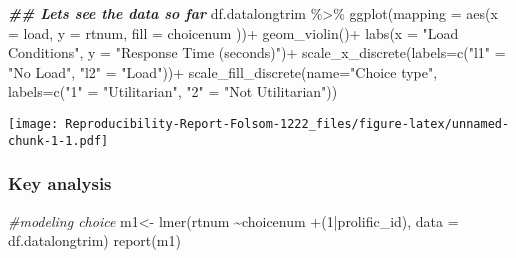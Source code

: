 \documentclass[
]{article}
\newenvironment{Shaded}{\begin{snugshade}}{\end{snugshade}}
\newcommand{\AttributeTok}[1]{\textcolor[rgb]{0.77,0.63,0.00}{#1}}
\newcommand{\CommentTok}[1]{\textcolor[rgb]{0.56,0.35,0.01}{\textit{#1}}}
\newcommand{\DecValTok}[1]{\textcolor[rgb]{0.00,0.00,0.81}{#1}}
\newcommand{\DocumentationTok}[1]{\textcolor[rgb]{0.56,0.35,0.01}{\textbf{\textit{#1}}}}
\newcommand{\FunctionTok}[1]{\textcolor[rgb]{0.00,0.00,0.00}{#1}}
\newcommand{\NormalTok}[1]{#1}
\newcommand{\OtherTok}[1]{\textcolor[rgb]{0.56,0.35,0.01}{#1}}
\newcommand{\SpecialCharTok}[1]{\textcolor[rgb]{0.00,0.00,0.00}{#1}}
\newcommand{\StringTok}[1]{\textcolor[rgb]{0.31,0.60,0.02}{#1}}
\begin{document}
\begin{Shaded}
\begin{Highlighting}[]
\DocumentationTok{\#\# Lets see the data so far}
\NormalTok{df.datalongtrim }\SpecialCharTok{\%\textgreater{}\%} 
  \FunctionTok{ggplot}\NormalTok{(}\AttributeTok{mapping =} \FunctionTok{aes}\NormalTok{(}\AttributeTok{x =}\NormalTok{ load,}
         \AttributeTok{y =}\NormalTok{ rtnum,}
         \AttributeTok{fill =}\NormalTok{ choicenum}
\NormalTok{        ))}\SpecialCharTok{+}
  \FunctionTok{geom\_violin}\NormalTok{()}\SpecialCharTok{+}
  \FunctionTok{labs}\NormalTok{(}\AttributeTok{x =} \StringTok{"Load Conditions"}\NormalTok{,}
       \AttributeTok{y =} \StringTok{"Response Time (seconds)"}\NormalTok{)}\SpecialCharTok{+}
  \FunctionTok{scale\_x\_discrete}\NormalTok{(}\AttributeTok{labels=}\FunctionTok{c}\NormalTok{(}\StringTok{"l1"} \OtherTok{=} \StringTok{"No Load"}\NormalTok{,}
                            \StringTok{"l2"} \OtherTok{=} \StringTok{"Load"}\NormalTok{))}\SpecialCharTok{+}
  \FunctionTok{scale\_fill\_discrete}\NormalTok{(}\AttributeTok{name=}\StringTok{"Choice type"}\NormalTok{,}
                  \AttributeTok{labels=}\FunctionTok{c}\NormalTok{(}\StringTok{"1"} \OtherTok{=} \StringTok{"Utilitarian"}\NormalTok{,}
                           \StringTok{"2"} \OtherTok{=} \StringTok{"Not Utilitarian"}\NormalTok{))}
\end{Highlighting}
\end{Shaded}

\texttt{[image: Reproducibility-Report-Folsom-1222\_files/figure-latex/unnamed-chunk-1-1.pdf]}

\hypertarget{key-analysis}{%
\subsubsection{Key analysis}\label{key-analysis}}

\begin{Shaded}
\begin{Highlighting}[]
\CommentTok{\#modeling choice}
\NormalTok{m1}\OtherTok{\textless{}{-}} \FunctionTok{lmer}\NormalTok{(rtnum }\SpecialCharTok{\textasciitilde{}}\NormalTok{choicenum }\SpecialCharTok{+}\NormalTok{(}\DecValTok{1}\SpecialCharTok{|}\NormalTok{prolific\_id),}
          \AttributeTok{data =}\NormalTok{ df.datalongtrim)}
\FunctionTok{report}\NormalTok{(m1) }
\end{Highlighting}
\end{Shaded}
\end{document}
